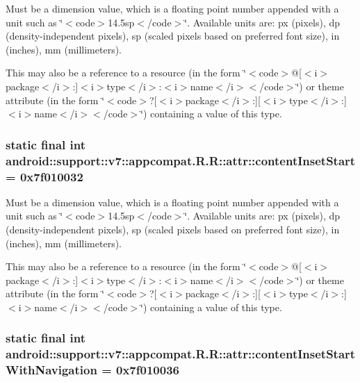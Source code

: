 Must be a dimension value, which is a floating point number appended with a unit such as \char`\"{}$<$code$>$14.5sp$<$/code$>$\char`\"{}. Available units are: px (pixels), dp (density-independent pixels), sp (scaled pixels based on preferred font size), in (inches), mm (millimeters). 

This may also be a reference to a resource (in the form \char`\"{}$<$code$>$@\mbox{[}$<$i$>$package$<$/i$>$:\mbox{]}$<$i$>$type$<$/i$>$:$<$i$>$name$<$/i$>$$<$/code$>$\char`\"{}) or theme attribute (in the form \char`\"{}$<$code$>$?\mbox{[}$<$i$>$package$<$/i$>$:\mbox{]}\mbox{[}$<$i$>$type$<$/i$>$:\mbox{]}$<$i$>$name$<$/i$>$$<$/code$>$\char`\"{}) containing a value of this type. \hypertarget{classandroid_1_1support_1_1v7_1_1appcompat_1_1_r_1_1attr_dd1a34ba2e76a0ec5875d2b9e30590cd}{
\subsubsection[{contentInsetStart}]{\setlength{\rightskip}{0pt plus 5cm}static final int android::support::v7::appcompat.R.R::attr::contentInsetStart = 0x7f010032}}
\label{classandroid_1_1support_1_1v7_1_1appcompat_1_1_r_1_1attr_dd1a34ba2e76a0ec5875d2b9e30590cd}


Must be a dimension value, which is a floating point number appended with a unit such as \char`\"{}$<$code$>$14.5sp$<$/code$>$\char`\"{}. Available units are: px (pixels), dp (density-independent pixels), sp (scaled pixels based on preferred font size), in (inches), mm (millimeters). 

This may also be a reference to a resource (in the form \char`\"{}$<$code$>$@\mbox{[}$<$i$>$package$<$/i$>$:\mbox{]}$<$i$>$type$<$/i$>$:$<$i$>$name$<$/i$>$$<$/code$>$\char`\"{}) or theme attribute (in the form \char`\"{}$<$code$>$?\mbox{[}$<$i$>$package$<$/i$>$:\mbox{]}\mbox{[}$<$i$>$type$<$/i$>$:\mbox{]}$<$i$>$name$<$/i$>$$<$/code$>$\char`\"{}) containing a value of this type. \hypertarget{classandroid_1_1support_1_1v7_1_1appcompat_1_1_r_1_1attr_1f2199e61f5f1b097d142fe2d80191ac}{
\subsubsection[{contentInsetStartWithNavigation}]{\setlength{\rightskip}{0pt plus 5cm}static final int android::support::v7::appcompat.R.R::attr::contentInsetStartWithNavigation = 0x7f010036}}
\label{classandroid_1_1support_1_1v7_1_1appcompat_1_1_r_1_1attr_1f2199e61f5f1b097d142fe2d80191ac}



